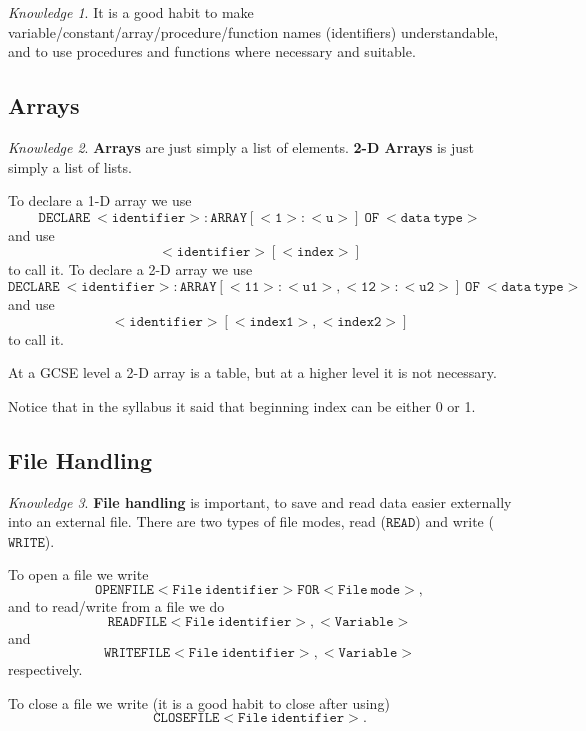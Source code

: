 \documentclass[8pt]{article}
\theoremstyle{remark}
\newtheorem{knowledge}{Knowledge}[subsection]
\begin{document}
            \begin{knowledge}
                It is a good habit to make variable/constant/array/procedure/function names (identifiers) understandable, and to use procedures and functions where necessary and suitable.
            \end{knowledge}
        \subsection{Arrays}
            
            \begin{knowledge}
                \textbf{Arrays} are just simply a list of elements. \textbf{2-D Arrays} is just simply a list of lists.

                To declare a 1-D array we use
                \[
                    \mathtt{DECLARE\ <identifier>:ARRAY[<1>:<u>]\ OF\ <data\ type>}
                \]
                and use
                \[
                    \mathtt{<identifier>[<index>]}
                \]
                to call it. To declare a 2-D array we use
                \[
                    \mathtt{DECLARE\ <identifier>:ARRAY[<11>:<u1>, <12>:<u2>]\ OF\ <data\ type>}
                \]
                and use
                \[
                    \mathtt{<identifier>[<index1>, <index2>]}
                \]
                to call it.

                At a GCSE level a 2-D array is a table, but at a higher level it is not necessary.

                Notice that in the syllabus it said that beginning index can be either 0 or 1.
            \end{knowledge}

        \subsection{File Handling}
            
            \begin{knowledge}
                \textbf{File handling} is important, to save and read data easier externally into an external file. There are two types of file modes, read (\(\mathtt{READ}\)) and write (\(\mathtt{WRITE}\)).

                To open a file we write
                \[
                    \mathtt{OPENFILE <File\ identifier> FOR <File\ mode>},
                \]
                and to read/write from a file we do
                \[
                    \mathtt{READFILE <File\ identifier>, <Variable>}
                \]
                and
                \[
                    \mathtt{WRITEFILE <File\ identifier>, <Variable>}
                \]
                respectively.

                To close a file we write (it is a good habit to close after using)
                \[
                    \mathtt{CLOSEFILE <File\ identifier>}.
                \]
            \end{knowledge}
\end{document}
